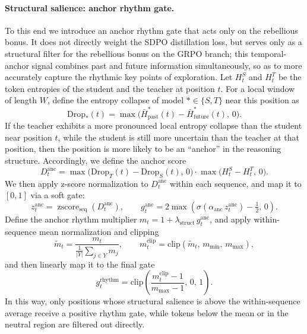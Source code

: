 \documentclass{article}
\DeclareMathOperator*{\zscore}{zscore}
\begin{document}
\paragraph{Structural salience: anchor rhythm gate.}
To this end we introduce an anchor rhythm gate that acts only on the rebellious bonus. It does not directly weight the SDPO distillation loss, but serves only as a structural filter for the rebellious bonus on the GRPO branch; this temporal-anchor signal combines past and future information simultaneously, so as to more accurately capture the rhythmic key points of exploration. Let $H_t^S$ and $H_t^T$ be the token entropies of the student and the teacher at position $t$. For a local window of length $W$, define the entropy collapse of model $*\in\{S,T\}$ near this position as
\begin{equation}
\mathrm{Drop}_*(t)=\max\!\big(\bar H^{*}_{\mathrm{past}}(t)-\bar H^{*}_{\mathrm{future}}(t),\,0\big).
\end{equation}
If the teacher exhibits a more pronounced local entropy collapse than the student near position $t$, while the student is still more uncertain than the teacher at that position, then the position is more likely to be an ``anchor'' in the reasoning structure. Accordingly, we define the anchor score
\begin{equation}
D_t^{\mathrm{anc}}
=
\max\!\big(\mathrm{Drop}_T(t)-\mathrm{Drop}_S(t),\,0\big)
\cdot
\max\!\big(H_t^S-H_t^T,\,0\big).
\end{equation}
We then apply z-score normalization to $D_t^{\mathrm{anc}}$ within each sequence, and map it to $[0,1]$ via a soft gate:
\begin{equation}
z_t^{\mathrm{anc}}=\zscore_{\mathrm{seq}}(D_t^{\mathrm{anc}}),
\qquad
g_t^{\mathrm{anc}}
=
2\max\!\left(\sigma(\alpha_{\mathrm{anc}}\, z_t^{\mathrm{anc}})-\tfrac12,\,0\right).
\end{equation}
Define the anchor rhythm multiplier $m_t = 1 + \lambda_{\mathrm{struct}}\, g_t^{\mathrm{anc}}$, and apply within-sequence mean normalization and clipping
\begin{equation}
\tilde m_t=\frac{m_t}{\tfrac{1}{|Y|}\sum_{j\in Y}m_j},
\qquad
m_t^{\mathrm{clip}}=\mathrm{clip}(\tilde m_t,\, m_{\min},\, m_{\max}),
\end{equation}
and then linearly map it to the final gate
\begin{equation}
g_t^{\mathrm{rhythm}}
=
\mathrm{clip}\!\left(
\frac{m_t^{\mathrm{clip}}-1}{m_{\max}-1},\,0,\,1
\right).
\end{equation}
In this way, only positions whose structural salience is above the within-sequence average receive a positive rhythm gate, while tokens below the mean or in the neutral region are filtered out directly.
\end{document}
